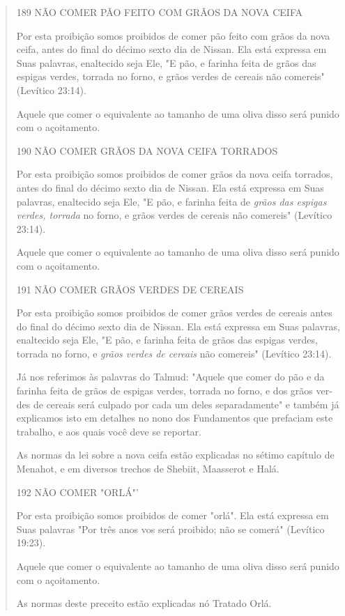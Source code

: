 \begin{quote}189 NÃO COMER PÃO FEITO COM GRÃOS DA NOVA CEIFA

Por esta proibição somos proibidos de comer pão feito com grãos da nova
ceifa, antes do final do décimo sexto dia de Nissan. Ela está expressa
em Suas palavras, enaltecido seja Ele, "E pão, e farinha feita de grãos
das espigas verdes, torrada no forno, e grãos verdes de cereais não
comereis" (Le­vítico 23:14).

Aquele que comer o equivalente ao tamanho de uma oliva disso será punido
com o açoitamento.

190 NÃO COMER GRÃOS DA NOVA CEIFA TORRADOS

Por esta proibição somos proibidos de comer grãos da nova ceifa
tor­rados, antes do final do décimo sexto dia de Nissan. Ela está
expressa em Suas palavras, enaltecido seja Ele, "E pão, e farinha feita
de \emph{grãos das espigas verdes, torrada} no forno, e grãos verdes de
cereais não comereis" (Levítico 23:14).

Aquele que comer o equivalente ao tamanho de uma oliva disso será punido
com o açoitamento.

191 NÃO COMER GRÃOS VERDES DE CEREAIS

Por esta proibição somos proibidos de comer grãos verdes de ce­reais
antes do final do décimo sexto dia de Nissan. Ela está expressa em Suas
palavras, enaltecido seja Ele, "E pão, e farinha feita de grãos das
espigas verdes, torrada no forno, e \emph{grãos verdes de cereais} não
comereis" (Levítico 23:14).

Já nos referimos às palavras do Talmud: "Aquele que comer do pão e da
farinha feita de grãos de espigas verdes, torrada no forno, e dos grãos
ver­des de cereais será culpado por cada um deles separadamente" e
também já explicamos isto em detalhes no nono dos Fundamentos que
prefaciam este tra­balho, e aos quais você deve se reportar.

As normas da lei sobre a nova ceifa estão explicadas no sétimo capí­tulo
de Menahot, e em diversos trechos de Shebiit, Maasserot e Halá.

192 NÃO COMER "ORLÁ"'

Por esta proibição somos proibidos de comer "orlá". Ela está ex­pressa
em Suas palavras "Por três anos vos será proibido; não se comerá"
(Le­vítico 19:23).

Aquele que comer o equivalente ao tamanho de uma oliva disso será punido
com o açoitamento.

As normas deste preceito estão explicadas nó Tratado Orlá.


\end{quote}
